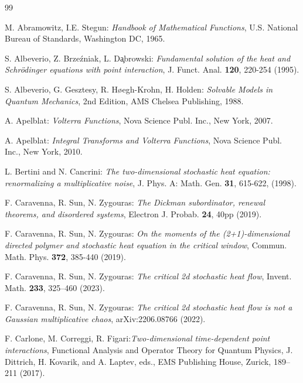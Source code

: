 \documentclass[10pt]{article}
\numberwithin{equation}{section}
\theoremstyle{definition}
\begin{document}
\begin{thebibliography}{99}


 M. Abramowitz, I.E. Stegun: \emph{Handbook of Mathematical Functions}, U.S. National Bureau of Standards,  Washington DC, 1965.


 S. Albeverio, Z. Brze\'zniak, L. D\c{a}browski: \emph{Fundamental solution of the heat and Schr\"odinger equations with point interaction}, J. Funct. Anal. \textbf{120}, 220-254 (1995).


 S. Albeverio, G. Gesztesy, R. H{\o}egh-Krohn, H. Holden: \emph{Solvable Models in Quantum Mechanics}, 2nd Edition, AMS Chelsea Publishing, 1988.



  A. Apelblat: \emph{Volterra Functions}, Nova Science Publ. Inc., New York, 2007.


  A. Apelblat: \emph{Integral Transforms and Volterra Functions}, Nova Science Publ. Inc., New York, 2010.




 L. Bertini and N. Cancrini: \emph{The two-dimensional stochastic heat equation: renormalizing a multiplicative
noise}, J. Phys. A: Math. Gen. \textbf{31}, 615-622, (1998).




 F. Caravenna, R. Sun, N. Zygouras: \emph{The Dickman subordinator, renewal theorems, and disordered
systems},  Electron J. Probab. \textbf{24}, 40pp (2019).





  F. Caravenna, R. Sun, N. Zygouras: \emph{On the moments of the (2+1)-dimensional directed polymer and stochastic heat equation in the critical window}, Commun. Math. Phys. \textbf{372}, 385-440 (2019).


  F. Caravenna, R. Sun, N. Zygouras: \emph{The critical 2d  stochastic heat flow}, Invent. Math. \textbf{233}, 325–460 (2023).


  F. Caravenna, R. Sun, N. Zygouras: \emph{The critical  2d stochastic heat flow is not a Gaussian multiplicative chaos}, 	\textup{arXiv:2206.08766} (2022).

  F. Carlone, M. Correggi, R. Figari:\emph{Two-dimensional time-dependent point interactions}, Functional Analysis and Operator Theory for Quantum Physics, J. Dittrich, H. Kovarik, and A. Laptev, eds., EMS Publishing House, Zurick, 189--211 (2017).



\end{thebibliography}
\end{document}
